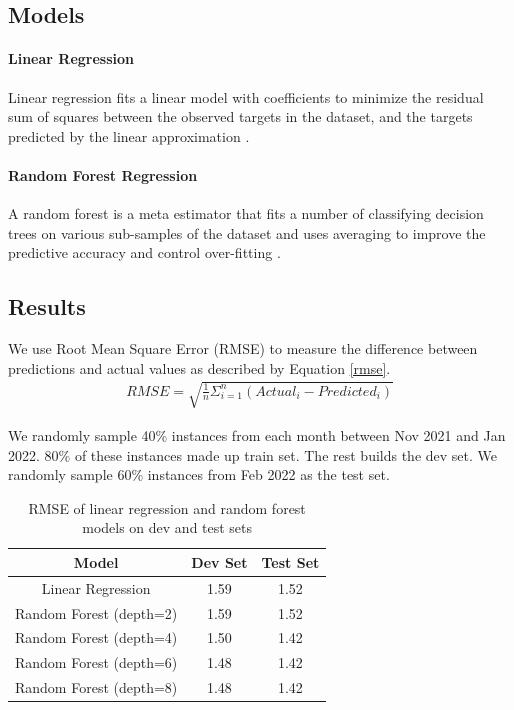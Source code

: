 \documentclass[11pt]{article}
\begin{document}
\subsection{Models}
\paragraph{Linear Regression}
Linear regression fits a linear model with coefficients to minimize the residual sum of squares between the observed targets in the dataset, and the targets predicted by the linear approximation \cite{scikit-learn}.

\paragraph{Random Forest Regression}
A random forest is a meta estimator that fits a number of classifying decision trees on various sub-samples of the dataset and uses averaging to improve the predictive accuracy and control over-fitting
\cite{scikit-learn}. 


\subsection{Results}
We use Root Mean Square Error (RMSE) to measure the difference between predictions and actual values as described by Equation \ref{rmse}.  
\begin{align}
    RMSE = \sqrt{\frac{1}{n}\Sigma_{i=1}^{n}(Actual_i -Predicted_i)}
\label{rmse}
\end{align}

We randomly sample 40\% instances from each month between Nov 2021 and Jan 2022. 80\% of these instances made up train set. The rest builds the dev set. We randomly sample 60\% instances from Feb 2022 as the test set.
\begin{table}[]
    \centering
    \begin{tabular}{c|c|c}
    \hline
         Model& Dev Set & Test Set \\
    \hline
         Linear Regression& 1.59&1.52\\
         Random Forest (depth=2) & 1.59&1.52\\
         Random Forest (depth=4) & 1.50&1.42\\
         Random Forest (depth=6) & 1.48&1.42\\
         Random Forest (depth=8) & 1.48&1.42\\
    \hline
    \end{tabular}
    \caption{RMSE of linear regression and random forest models on dev and test sets}
    \label{tab:result}
\end{table}
\end{document}
